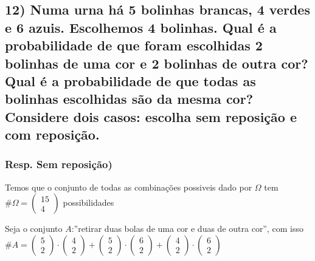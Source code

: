 \documentclass[portuguese]{article}
\begin{document}
\textbf{\textcompwordmark{}}


\subsection*{\textmd{12) Numa urna há 5 bolinhas brancas, 4 verdes e 6 azuis.
Escolhemos 4 bolinhas. Qual é a probabilidade de que foram escolhidas
2 bolinhas de uma cor e 2 bolinhas de outra cor? Qual é a probabilidade
de que todas as bolinhas escolhidas são da mesma cor? Considere dois
casos: escolha sem reposição e com reposição.}}


\subsubsection*{\textmd{Resp. Sem reposição)}}

Temos que o conjunto de todas as combinações possiveis dado por $\Omega$
tem $\#\Omega=\left(\begin{array}{c}
15\\
4
\end{array}\right)$ possibilidades

Seja o conjunto $A$:''retirar duas bolas de uma cor e duas de outra
cor'', com isso $\#A=\left(\begin{array}{c}
5\\
2
\end{array}\right)\cdot\left(\begin{array}{c}
4\\
2
\end{array}\right)+\left(\begin{array}{c}
5\\
2
\end{array}\right)\cdot\left(\begin{array}{c}
6\\
2
\end{array}\right)+\left(\begin{array}{c}
4\\
2
\end{array}\right)\cdot\left(\begin{array}{c}
6\\
2
\end{array}\right)$
\end{document}
